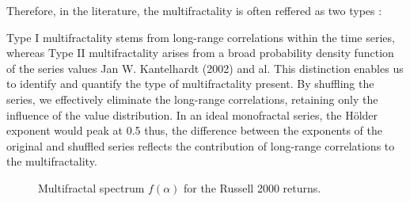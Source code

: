 \documentclass[11pt]{extarticle}
\begin{document}
Therefore, in the literature, the multifractality is often reffered as two types :

Type I multifractality stems from long-range correlations within the time series, whereas Type II multifractality arises
from a broad probability density function of the series values Jan W. Kantelhardt (2002) and al. This distinction enables us to identify and quantify
the type of multifractality present. By shuffling the series, we effectively eliminate the long-range correlations,
retaining only the influence of the value distribution. In an ideal monofractal series, the Hölder exponent would peak
at 0.5 thus, the difference between the exponents of the original and shuffled series reflects the contribution of
long-range correlations to the multifractality.


\begin{figure}[htbp]
    \centering
    \caption{Multifractal spectrum $f(\alpha)$ for the Russell 2000 returns.}
\end{figure}

\FloatBarrier
\end{document}
